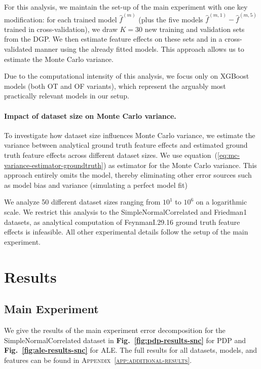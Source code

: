 \documentclass[runningheads]{llncs}
\begin{document}
For this analysis, we maintain the set-up of the main experiment with one key
modification: for each trained model $\hat f^{(m)}$ (plus the five
models $\hat f^{(m,1)} - \hat f^{(m,5)}$ trained in cross-validation), we draw $K=30$ new training
and validation sets from the DGP. We then estimate feature effects on these  %
sets and in a cross-validated manner using the already fitted models. This approach
allows us to estimate the Monte Carlo variance.

Due to the computational intensity of this analysis, we focus only on XGBoost models
(both OT and OF variants), which represent the arguably most practically relevant models
in our setup.

\paragraph{Impact of dataset size on Monte Carlo variance.}
To investigate how dataset size influences Monte Carlo variance,
we estimate the variance between analytical ground truth feature effects
and estimated ground truth feature effects across different dataset sizes.
We use equation~(\ref{eq:mc-variance-estimator-groundtruth}) as estimator
for the Monte Carlo variance. This approach entirely omits the model, thereby
eliminating other error sources such as model bias and variance (simulating a perfect model fit)

We analyze 50 different dataset sizes ranging from $10^1$ to $10^6$ on a logarithmic
scale. We restrict this analysis to the SimpleNormalCorrelated and Friedman1 datasets,
as analytical computation of FeynmanI.29.16 ground truth feature effects is infeasible.
All other experimental details follow the setup of the main experiment.

\section{Results}\label{sec:results}

\subsection{Main Experiment}

We give the results of the main experiment error decomposition for the
SimpleNormalCorrelated dataset in \textbf{Fig.\@~\ref{fig:pdp-results-snc}} for
PDP and \textbf{Fig.\@~\ref{fig:ale-results-snc}} for ALE. The full results for  %
all datasets, models, and features can be found in
\textsc{Appendix~\ref{app:additional-results}}.
\end{document}
